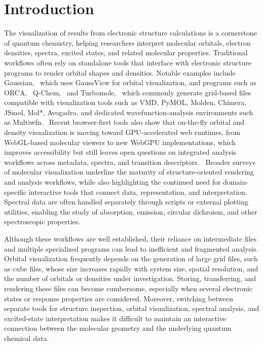 \documentclass[journal=jacsat,manuscript=article]{achemso}
\begin{document}
\section{Introduction}

The visualization of results from electronic structure calculations is a cornerstone of quantum chemistry, helping researchers interpret molecular orbitals, electron densities, spectra, excited states, and related molecular properties. Traditional workflows often rely on standalone tools that interface with electronic structure programs to render orbital shapes and densities. Notable examples include Gaussian,~\cite{g16} which uses GaussView for orbital visualization, and programs such as ORCA,~\cite{ORCA} Q-Chem,~\cite{Q-Chem} and Turbomole,~\cite{Turbomole} which commonly generate grid-based files compatible with visualization tools such as VMD, PyMOL, Molden, Chimera, JSmol, Mol*, Avogadro, and dedicated wavefunction-analysis environments such as Multiwfn.~\cite{humphrey1996vmd,pymol,molden,Molden2000,pettersen2004ucsf,hanson2013jsmol,molstar,Hanwell2012Avogadro,Lu2012Multiwfn} Recent browser-first tools also show that on-the-fly orbital and density visualization is moving toward GPU-accelerated web runtimes, from WebGL-based molecular viewers to new WebGPU implementations, which improves accessibility but still leaves open questions on integrated analysis workflows across metadata, spectra, and transition descriptors.~\cite{Rego2015_3Dmoljs,MOrbVis2026} Broader surveys of molecular visualization underline the maturity of structure-oriented rendering and analysis workflows, while also highlighting the continued need for domain-specific interactive tools that connect data, representation, and interpretation.~\cite{kozlikova2017visualization} Spectral data are often handled separately through scripts or external plotting utilities, enabling the study of absorption, emission, circular dichroism, and other spectroscopic properties.

Although these workflows are well established, their reliance on intermediate files and multiple specialized programs can lead to inefficient and fragmented analysis. Orbital visualization frequently depends on the generation of large grid files, such as cube files, whose size increases rapidly with system size, spatial resolution, and the number of orbitals or densities under investigation. Storing, transferring, and rendering these files can become cumbersome, especially when several electronic states or response properties are considered. Moreover, switching between separate tools for structure inspection, orbital visualization, spectral analysis, and excited-state interpretation makes it difficult to maintain an interactive connection between the molecular geometry and the underlying quantum chemical data.
\end{document}
